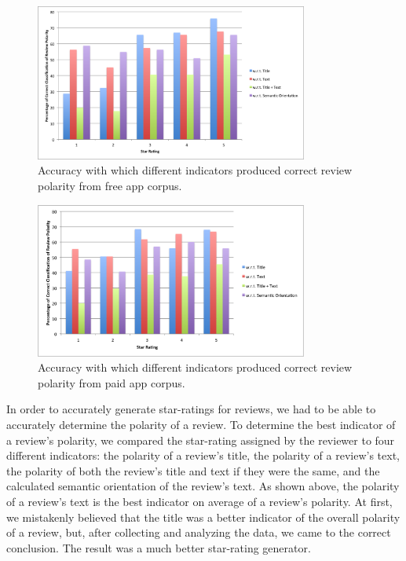\documentclass[11pt]{report} %
\begin{document}
	\begin{figure}[H]
	\centering
	\includegraphics[width=0.8\textwidth]{data/pmi-cue-free-pol-acc.png}
	\caption{Accuracy with which different indicators produced correct review polarity from free app corpus.}
	\label{fig:pmi-cue-free-pol-acc}
	\end{figure}

	\begin{figure}[H]
	\centering
	\includegraphics[width=0.8\textwidth]{data/pmi-cue-paid-pol-acc.png}
	\caption{Accuracy with which different indicators produced correct review polarity from paid app corpus.}
	\label{fig:pmi-cue-paid-pol-acc}
	\end{figure}

In order to accurately generate star-ratings for reviews, we had to be able to accurately determine the polarity of a review. To determine the best indicator of a review's polarity, we compared the star-rating assigned by the reviewer to four different indicators: the polarity of a review's title, the polarity of a review's text, the polarity of both the review's title and text if they were the same, and the calculated semantic orientation of the review's text. As shown above, the polarity of a review's text is the best indicator on average of a review's polarity. At first, we mistakenly believed that the title was a better indicator of the overall polarity of a review, but, after collecting and analyzing the data, we came to the correct conclusion. The result was a much better star-rating generator. 
\end{document}
